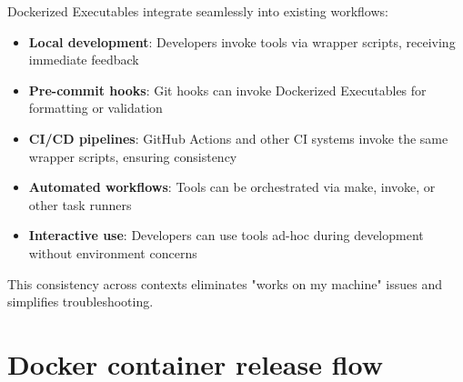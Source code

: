 Dockerized Executables integrate seamlessly into existing workflows:

\begin{itemize}
  \item \textbf{Local development}: Developers invoke tools via wrapper
    scripts, receiving immediate feedback

  \item \textbf{Pre-commit hooks}: Git hooks can invoke Dockerized Executables
    for formatting or validation

  \item \textbf{CI/CD pipelines}: GitHub Actions and other CI systems invoke
    the same wrapper scripts, ensuring consistency

  \item \textbf{Automated workflows}: Tools can be orchestrated via make,
    invoke, or other task runners

  \item \textbf{Interactive use}: Developers can use tools ad-hoc during
    development without environment concerns
\end{itemize}

This consistency across contexts eliminates "works on my machine" issues
and simplifies troubleshooting.

\section{Docker container release flow}


